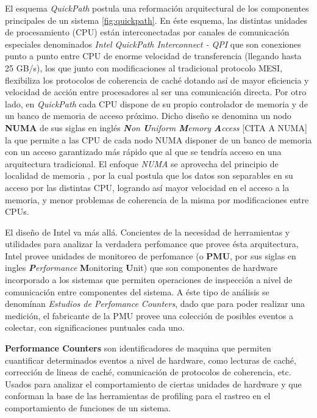 El esquema \emph{QuickPath} postula una reformación arquitectural de los componentes principales de un sistema \ref{fig:quickpath}. En éste esquema, las distintas unidades de procesamiento (CPU) están interconectadas por canales de comunicación especiales denominados \emph{Intel QuickPath Interconnect - QPI} que son conexiones punto a punto entre CPU de enorme velocidad de transferencia (llegando hasta 25 GB/s), los que junto con modificaciones al tradicional protocolo MESI, flexibiliza los protocolos de coherencia de caché dotando así de mayor eficiencia y velocidad de acción entre procesadores al ser una comunicación directa.
Por otro lado, en \emph{QuickPath} cada CPU dispone de su propio controlador de memoria y de un banco de memoria de acceso próximo. Dicho diseño se denomina un nodo \textbf{NUMA} de sus siglas en inglés \emph{\textbf{N}on \textbf{U}niform \textbf{M}emory \textbf{A}ccess} [CITA A NUMA] la que permite a las CPU de cada nodo NUMA disponer de un banco de memoria con un acceso garantizado más rápido que al que se tendría acceso en una arquitectura tradicional. El enfoque \emph{NUMA} se aprovecha del principio de localidad de memoria \cite{paper:memorylocality}, por la cual postula que los datos son separables en su acceso por las distintas CPU, logrando así mayor velocidad en el acceso a la memoria, y menor problemas de coherencia de la misma por modificaciones entre CPUs.

El diseño de Intel va más allá. Concientes de la necesidad de herramientas y utilidades para analizar la verdadera perfomance que provee ésta arquitectura, Intel provee unidades de monitoreo de perfomance (o \textbf{PMU}, por sus siglas en ingles \emph{\textbf{P}erformance} \textbf{M}onitoring \textbf{U}nit) que son componentes de hardware incorporado a los sistemas que permiten operaciones de inspección a nivel de comunicación entre componentes del sistema. A éste tipo de análisis se denomínan \emph{Estudios de Perfomance Counters}, dado que para poder realizar una medición, el fabricante de la PMU provee una colección de posibles eventos a colectar, con significaciones puntuales cada uno.

\begin{defn} \textbf{Performance Counters} son identificadores de maquina que permiten cuantificar determinados eventos a nivel de hardware, como lecturas de caché, corrección de lineas de caché, comunicación de protocolos de coherencia, etc. Usados para analizar el comportamiento de ciertas unidades de hardware y que conforman la base de las herramientas de profiling para el rastreo en el comportamiento de funciones de un sistema.
\end{defn}
 
